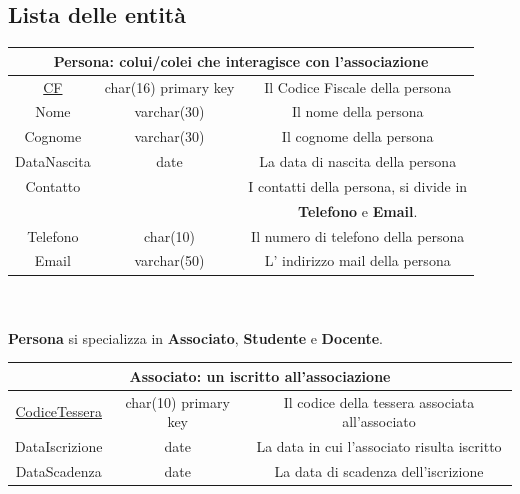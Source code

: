 \documentclass[11pt]{article}
\begin{document}
	\subsection{Lista delle entità}
		\begin{tabular}{|c|c|c|}
			\hline
			\multicolumn{3}{|c|}{\textbf{Persona}: colui/colei che interagisce con l'associazione}\\
			\hline
			\underline{CF} & char(16) primary key & Il Codice Fiscale della persona\\
			\hline
			Nome & varchar(30) & Il nome della persona\\
			\hline
			Cognome & varchar(30) & Il cognome della persona\\
			\hline
			DataNascita & date & La data di nascita della persona\\
			\hline
			Contatto &  & I contatti della persona, si divide in\\
			&  &\textbf{Telefono} e \textbf{Email}.\\
			Telefono & char(10) & Il numero di telefono della persona\\
			Email & varchar(50) & L' indirizzo mail della persona\\
			\hline
		\end{tabular}
		\\\\ \textbf{Persona} si specializza in \textbf{Associato}, \textbf{Studente} e \textbf{Docente}.\\
		\begin{tabular}{|c|c|c|}
			\hline
			\multicolumn{3}{|c|}{\textbf{Associato}: un iscritto all'associazione}\\
			\hline
			\underline{CodiceTessera} & char(10) primary key & Il codice della tessera associata all'associato\\
			\hline
			DataIscrizione & date & La data in cui l'associato risulta iscritto\\
			\hline
			DataScadenza & date & La data di scadenza dell'iscrizione\\
			\hline
		\end{tabular}
		\\\\
\end{document}
